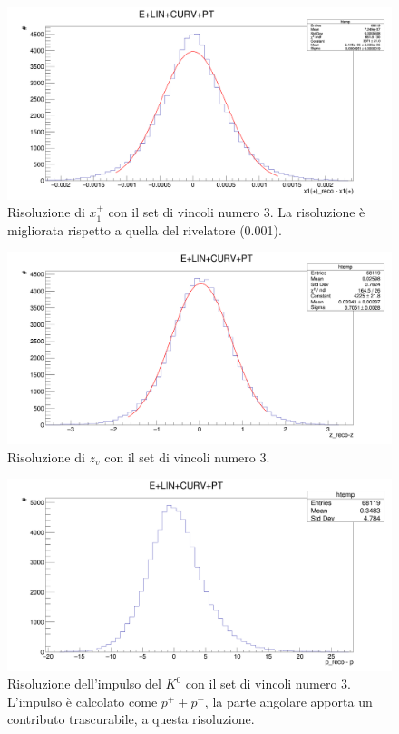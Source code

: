 \documentclass[8pt]{extarticle}
\begin{document}
\begin{figure}
	\begin{center}
		\includegraphics[scale=0.25]{set_3_x} 
		\caption{Risoluzione di $x_1^+$ con il set di vincoli numero 3. La risoluzione è migliorata rispetto a quella del rivelatore (0.001).}
		\label{fig:set_3_x}
	\end{center}
\end{figure}

\begin{figure}
	\begin{center}
		\includegraphics[scale=0.25]{set_3_z} 
		\caption{Risoluzione di $z_v$ con il set di vincoli numero 3.}
		\label{fig:set_3_z}
	\end{center}
\end{figure}

\begin{figure}
	\begin{center}
		\includegraphics[scale=0.25]{set_3_p} 
		\caption{Risoluzione dell'impulso del $K^0$ con il set di vincoli numero 3. L'impulso è calcolato come $p^+ + p^-$, la parte angolare apporta un contributo trascurabile, a questa risoluzione.}
		\label{fig:set_3_p}
	\end{center}
\end{figure}
\end{document}
